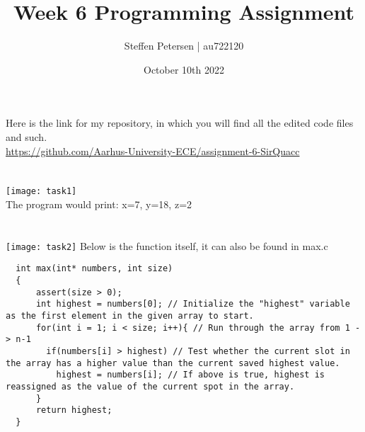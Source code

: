 \documentclass{article}
\title{Week 6 Programming Assignment}
\author{Steffen Petersen | au722120}
\date{October 10th 2022}
\begin{document}

\maketitle
\vspace{5pt}
\noindent Here is the link for my repository, in which you will find all the edited code files and such.\\
\url{https://github.com/Aarhus-University-ECE/assignment-6-SirQuacc}
\section{}
\texttt{[image: task1]}
\vspace{2pt}\\
The program would print: x=7, y=18, z=2
\pagebreak

\section{}
\texttt{[image: task2]}
\vspace{2pt}
Below is the function itself, it can also be found in max.c
\begin{lstlisting}
  int max(int* numbers, int size)
  {
      assert(size > 0);
      int highest = numbers[0]; // Initialize the "highest" variable as the first element in the given array to start.
      for(int i = 1; i < size; i++){ // Run through the array from 1 -> n-1
        if(numbers[i] > highest) // Test whether the current slot in the array has a higher value than the current saved highest value.
          highest = numbers[i]; // If above is true, highest is reassigned as the value of the current spot in the array.
      }
      return highest;
  }
\end{lstlisting}
\pagebreak
\end{document}
